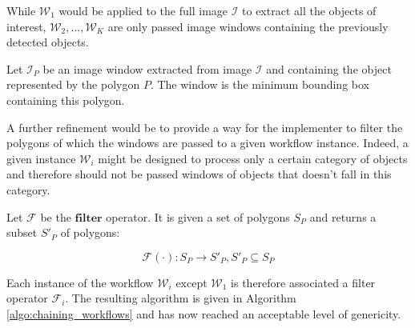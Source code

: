 While $\mathcal{W}_1$ would be applied to the full image $\mathcal{I}$ to extract all the objects of interest, $\mathcal{W}_2, ..., \mathcal{W}_K$ are only passed image windows containing the previously detected objects.

\begin{definition}\label{def:image_window}
	Let $\mathcal{I}_P$ be an image window extracted from image $\mathcal{I}$ and containing the object represented by the polygon $P$. The window is the minimum bounding box containing this polygon.
\end{definition}

A further refinement would be to provide a way for the implementer to filter the polygons of which the windows are passed to a given workflow instance. Indeed, a given instance $\mathcal{W}_i$ might be designed to process only a certain category of objects and therefore should not be passed windows of objects that doesn't fall in this category. 

\begin{definition}\label{def:filter_op}
	Let $\mathcal{F}$ be the $\textbf{filter}$ operator. It is given a set of polygons $S_P$ and returns a subset $S'_P$ of polygons:
	
	\begin{equation}
		\mathcal{F}(\cdot): S_P \rightarrow S'_P, S'_P \subseteq S_P
	\end{equation}
\end{definition}

Each instance of the workflow $\mathcal{W}_i$ except $\mathcal{W}_1$ is therefore associated a filter operator $\mathcal{F}_i$. The resulting algorithm is given in Algorithm \ref{algo:chaining_workflows} and has now reached an acceptable level of genericity.

